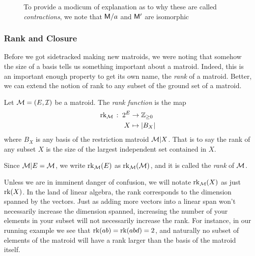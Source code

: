 \documentclass[12pt,oneside]{../../sfsuthesis}
\begin{document}
\begin{figure}[H]
\begin{subfigure}[t]{.45\textwidth}
    \end{subfigure}
    \caption{To provide a modicum of explanation as to why these are called \emph{contractions}, we note that \( \mathsf{M}/a \) and \( \mathsf{M}' \) are isomorphic}
    \label{fig:contractionMatroid}

\end{figure}


\subsubsection{Rank and Closure}

Before we got sidetracked making new matroids, we were noting that somehow the size of a basis tells us something important about a matroid.
Indeed, this is an important enough property to get its own name, the \emph{rank} of a matroid.
Better, we can extend the notion of rank to any subset of the ground set of a matroid.

\begin{definition}[Rank]\th\label{def:rank}

    Let \( \mathcal{M} = (E, \mathcal{I}) \) be a matroid.
    The \emph{rank function} is the map
    \begin{align*}
        \operatorname{rk}_{\mathcal{M}} \, : \; 2^E & \to \mathbb{Z}_{\geq 0} \\
        X                   & \mapsto |B_X|
    \end{align*}
    where \( B_X \) is any basis of the restriction matroid \( \mathcal{M}|X \).
    That is to say the rank of any subset \( X \) is the size of the largest independent set contained in \( X \).

    Since \( \mathcal{M}|E = \mathcal{M} \), we write \( \operatorname{rk}_{\mathcal{M}}(E) \) as \( \operatorname{rk}_{\mathcal{M}}(\mathcal{M}) \), and it is called the \emph{rank} of \( \mathcal{M} \).
\end{definition}
Unless we are in imminent danger of confusion, we will notate \( \operatorname{rk}_{\mathcal{M}}(X) \) as just \( \operatorname{rk}(X) \).
In the land of linear algebra, the rank corresponds to the dimension spanned by the vectors.
Just as adding more vectors into a linear span won't necessarily increase the dimension spanned, increasing the number of your elements in your subset will not necessarily increase the rank.
For instance, in our running example we see that \( \operatorname{rk}(ab) = \operatorname{rk}(abd) = 2 \),
and naturally no subset of elements of the matroid will have a rank larger than the basis of the matroid itself.
\end{document}
